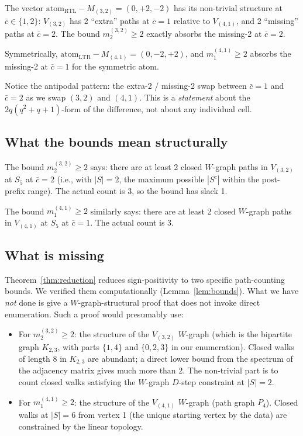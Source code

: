 \documentclass[11pt]{article}
\theoremstyle{definition}
\begin{document}
The vector $\mathrm{atom}_{\mathrm{RTL}} - M_{(3,2)} = (0, +2, -2)$ has its non-trivial structure at $\bar c \in \{1, 2\}$: $V_{(3,2)}$ has 2 ``extra'' paths at $\bar c = 1$ relative to $V_{(4,1)}$, and 2 ``missing'' paths at $\bar c = 2$. The bound $m^{(3,2)}_2 \geq 2$ exactly absorbs the missing-2 at $\bar c = 2$.

Symmetrically, $\mathrm{atom}_{\mathrm{LTR}} - M_{(4,1)} = (0, -2, +2)$, and $m^{(4,1)}_1 \geq 2$ absorbs the missing-2 at $\bar c = 1$ for the symmetric atom.

Notice the antipodal pattern: the extra-2 / missing-2 swap between $\bar c = 1$ and $\bar c = 2$ as we swap $(3, 2)$ and $(4, 1)$. This is a \emph{statement} about the $2q(q^2+q+1)$-form of the difference, not about any individual cell.

\subsection*{What the bounds mean structurally}

The bound $m^{(3,2)}_2 \geq 2$ says: there are at least 2 closed $W$-graph paths in $V_{(3,2)}$ at $S_5$ at $\bar c = 2$ (i.e., with $|S| = 2$, the maximum possible $|S^c|$ within the post-prefix range). The actual count is 3, so the bound has slack 1.

The bound $m^{(4,1)}_1 \geq 2$ similarly says: there are at least 2 closed $W$-graph paths in $V_{(4,1)}$ at $S_5$ at $\bar c = 1$. The actual count is 3.

\subsection*{What is missing}

Theorem~\ref{thm:reduction} reduces sign-positivity to two specific path-counting bounds. We verified them computationally (Lemma~\ref{lem:bounds}). What we have \emph{not} done is give a $W$-graph-structural proof that does not invoke direct enumeration. Such a proof would presumably use:
\begin{itemize}[leftmargin=2em,topsep=0.3em,itemsep=0.2em]
\item For $m^{(3,2)}_2 \geq 2$: the structure of the $V_{(3,2)}$ $W$-graph (which is the bipartite graph $K_{2,3}$, with parts $\{1, 4\}$ and $\{0, 2, 3\}$ in our enumeration). Closed walks of length 8 in $K_{2,3}$ are abundant; a direct lower bound from the spectrum of the adjacency matrix gives much more than 2. The non-trivial part is to count closed walks satisfying the $W$-graph $D$-step constraint at $|S| = 2$.

\item For $m^{(4,1)}_1 \geq 2$: the structure of the $V_{(4,1)}$ $W$-graph (path graph $P_4$). Closed walks at $|S| = 6$ from vertex 1 (the unique starting vertex by the data) are constrained by the linear topology.
\end{itemize}
\end{document}
